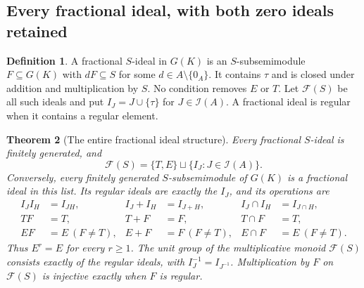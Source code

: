 \documentclass[11pt,a4paper]{article}
\newtheorem{theorem}{Theorem}[section]
\theoremstyle{definition}\newtheorem{definition}[theorem]{Definition}
\begin{document}
\subsection{Every fractional ideal, with both zero ideals retained}

\begin{definition}
A fractional \(S\)-ideal in \(G(K)\) is an \(S\)-subsemimodule
\(F\subseteq G(K)\) with \(dF\subseteq S\) for some
\(d\in A\setminus\{0_A\}\). It contains \(\tau\) and is closed under
addition and multiplication by \(S\). No condition removes \(E\)
or \(T\). Let \(\mathcal F(S)\) be all such ideals and put
\(I_J=J\cup\{\tau\}\) for \(J\in\mathcal I(A)\).
A fractional ideal is regular when it contains a regular element.
\end{definition}

\begin{theorem}[The entire fractional ideal structure]\label{thm:sz-all-fractional}
Every fractional \(S\)-ideal is finitely generated, and
\begin{equation}\label{eq:sz-all-fractional}
 \mathcal F(S)=\{T,E\}\sqcup\{I_J:J\in\mathcal I(A)\}.
\end{equation}
Conversely, every finitely generated \(S\)-subsemimodule of \(G(K)\)
is a fractional ideal in this list.
Its regular ideals are exactly the \(I_J\), and its operations are
\begin{align}
 I_JI_H&=I_{JH},&
 I_J+I_H&=I_{J+H},&
 I_J\cap I_H&=I_{J\cap H}, \label{eq:sz-ideal-operations}\\
 TF&=T,& T+F&=F,&T\cap F&=T, \label{eq:sz-absent-ideal}\\
 EF&=E\ (F\ne T),&
 E+F&=F\ (F\ne T),&
 E\cap F&=E\ (F\ne T). \label{eq:sz-supported-ideal}
\end{align}
Thus \(E^r=E\) for every \(r\ge1\). The unit group of the
multiplicative monoid \(\mathcal F(S)\) consists exactly of the
regular ideals, with \(I_J^{-1}=I_{J^{-1}}\).
Multiplication by \(F\) on \(\mathcal F(S)\) is injective exactly
when \(F\) is regular.
\end{theorem}
\end{document}

